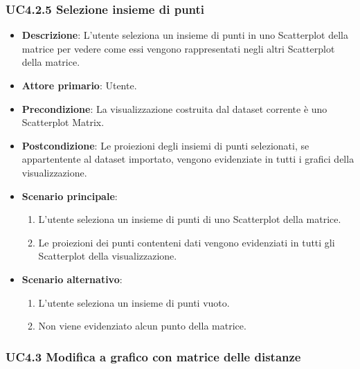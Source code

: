 \subsubsection{UC4.2.5 Selezione insieme di punti}
\label{ssub:uc4.2.5}
\begin{itemize}
    \item \textbf{Descrizione}: L'utente seleziona un insieme di punti in uno Scatterplot della matrice per vedere come 
                                essi vengono rappresentati negli altri Scatterplot della matrice.
	
    \item \textbf{Attore primario}: Utente.
    
    \item \textbf{Precondizione}:   La visualizzazione costruita dal dataset corrente è uno Scatterplot Matrix.
    \item \textbf{Postcondizione}:  Le proiezioni degli insiemi di punti selezionati, se appartentente al dataset importato, 
                                    vengono evidenziate in tutti i grafici della visualizzazione.

	\item \textbf{Scenario principale}:
        \begin{enumerate}
            \item L'utente seleziona un insieme di punti di uno Scatterplot della matrice.
            \item Le proiezioni dei punti contenteni dati vengono evidenziati in tutti gli Scatterplot della visualizzazione.
        \end{enumerate}

    \item \textbf{Scenario alternativo}:
        \begin{enumerate}
            \item L'utente seleziona un insieme di punti vuoto.
            \item Non viene evidenziato alcun punto della matrice.
        \end{enumerate}

\end{itemize}

\newpage
\subsubsection{UC4.3 Modifica a grafico con matrice delle distanze}
\label{ssub:uc4.3}

